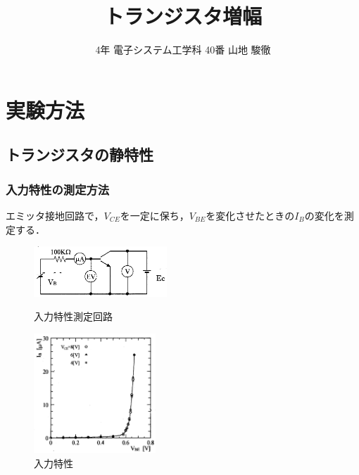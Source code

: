 \documentclass[10pt, a4j, dvipdfmx]{jarticle}
\title{トランジスタ増幅}
\author{4年 電子システム工学科 40番  山地 駿徹}
\begin{document}
    \section{実験方法}
    \subsection{トランジスタの静特性}

    \subsubsection{入力特性の測定方法}
    エミッタ接地回路で，$V_{CE}$を一定に保ち，$V_{BE}$を変化させたときの$I_B$の変化を測定する．
    \begin{figure}[H]
        \begin{minipage}{0.5\hsize}
            \centering
            \includegraphics[width=50mm]{fig-1.png}
            \caption{入力特性測定回路}
            \label{fig:1}
        \end{minipage}
        \begin{minipage}{0.5\hsize}
            \centering
            \includegraphics[height=45mm]{fig-2.png}
            \caption{入力特性}
            \label{fig:2}
        \end{minipage}
    \end{figure}
\end{document}
